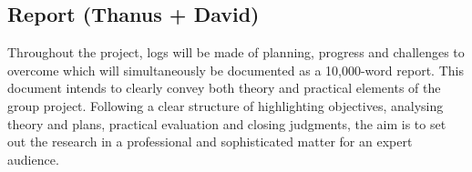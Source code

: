 \subsection*{Report (Thanus + David)}

Throughout the project, logs will be made of planning, progress and challenges to overcome which will simultaneously be documented as a 10,000-word report. This document intends to clearly convey both theory and practical elements of the group project. Following a clear structure of highlighting objectives, analysing theory and plans, practical evaluation and closing judgments, the aim is to set out the research in a professional and sophisticated matter for an expert audience.